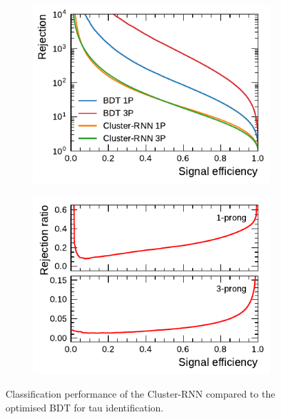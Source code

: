 \begin{figure}[ht]
  \begin{subfigure}[t]{0.48\textwidth}
    \centering
    \includegraphics{./figures/rnn/cluster/roc.pdf}
  \end{subfigure}\hfill
  \begin{subfigure}[t]{0.48\textwidth}
    \centering
    \includegraphics{./figures/rnn/cluster/ratios.pdf}
  \end{subfigure}
  \caption{Classification performance of the Cluster-RNN compared to the optimised
    BDT for tau identification.}
  \label{fig:cluster_rnn_roc_ratios}
\end{figure}


